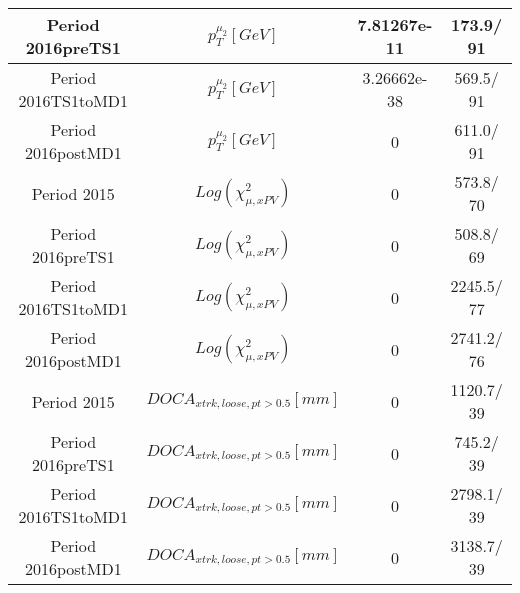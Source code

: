 \documentclass{article}
\begin{document}
\begin{longtable}{c|c|c|c}
\hline
 Period 2016preTS1 & $p_{T}^{\mu_{2}} [GeV]$ & 7.81267e-11 & 173.9/ 91\\
\hline
 Period 2016TS1toMD1 & $p_{T}^{\mu_{2}} [GeV]$ & 3.26662e-38 & 569.5/ 91\\
\hline
 Period 2016postMD1 & $p_{T}^{\mu_{2}} [GeV]$ & 0 & 611.0/ 91\\
\hline
 Period 2015 & $Log(\chi^{2}_{\mu,xPV})$ & 0 & 573.8/ 70\\
\hline
 Period 2016preTS1 & $Log(\chi^{2}_{\mu,xPV})$ & 0 & 508.8/ 69\\
\hline
 Period 2016TS1toMD1 & $Log(\chi^{2}_{\mu,xPV})$ & 0 & 2245.5/ 77\\
\hline
 Period 2016postMD1 & $Log(\chi^{2}_{\mu,xPV})$ & 0 & 2741.2/ 76\\
\hline
 Period 2015 & $DOCA_{xtrk, loose, pt>0.5} [mm]$ & 0 & 1120.7/ 39\\
\hline
 Period 2016preTS1 & $DOCA_{xtrk, loose, pt>0.5} [mm]$ & 0 & 745.2/ 39\\
\hline
 Period 2016TS1toMD1 & $DOCA_{xtrk, loose, pt>0.5} [mm]$ & 0 & 2798.1/ 39\\
\hline
 Period 2016postMD1 & $DOCA_{xtrk, loose, pt>0.5} [mm]$ & 0 & 3138.7/ 39\\
\hline
\end{longtable}
\end{document}
